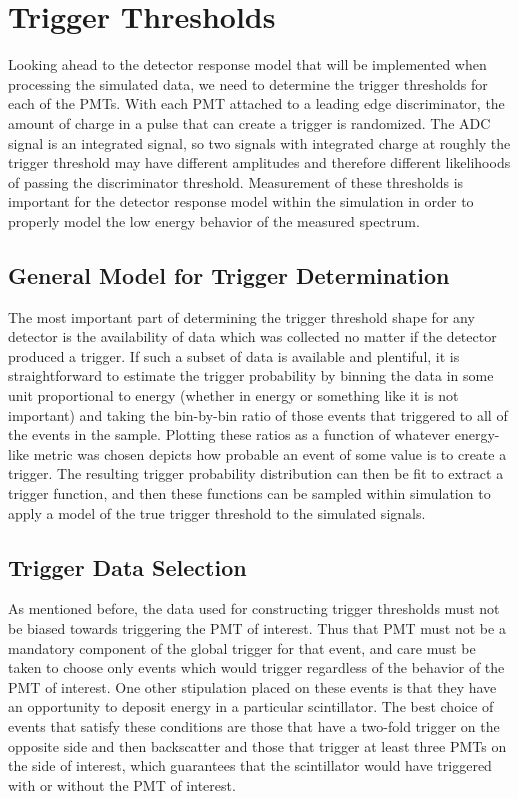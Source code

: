 \section{Trigger Thresholds} \label{sec:triggerThresh}

Looking ahead to the detector response model that will be implemented when processing
the simulated data, we need to determine the trigger thresholds for each of the
PMTs. With each PMT attached to a leading edge discriminator, the
amount of charge in a pulse that can create a trigger is randomized. The ADC signal
is an integrated signal, so two signals with integrated charge
at roughly the trigger threshold may have
different amplitudes and therefore different likelihoods of passing the discriminator threshold.
Measurement of these thresholds is important for the detector response model within the simulation
in order to properly model the low energy behavior of the measured spectrum.


\subsection{General Model for Trigger Determination} \label{ssec:genTrigModel}

The most important part of determining the trigger threshold shape for 
any detector is the availability of data which was collected no matter if 
the detector produced a trigger. If such a subset of 
data is available and plentiful, it is straightforward to estimate
the trigger probability by binning the data in some unit proportional to 
energy (whether in energy or something like it is not important) and taking 
the bin-by-bin ratio of those events that triggered to all of the events in the 
sample. Plotting these ratios as a function of whatever energy-like metric was chosen
depicts how probable an event of some value is to create a trigger. The resulting
trigger probability distribution can then be fit to extract a trigger function, and then
these functions can be sampled within simulation to apply a model of the
true trigger threshold to the simulated signals.


\subsection{Trigger Data Selection}
As mentioned before, the data used for constructing trigger thresholds must not be 
biased towards triggering the PMT of interest. Thus that PMT must not be a mandatory 
component of the global trigger for that event, and care must be taken to choose only 
events which would trigger regardless of the behavior of the PMT of interest. One
other stipulation placed on these events is that they have an opportunity to 
deposit energy in a particular scintillator. The best choice of events that 
satisfy these conditions are those that have a two-fold trigger on the opposite side 
and then backscatter and those that trigger at least three PMTs on the side of 
interest, which guarantees that the scintillator would have triggered with or without 
the PMT of interest.	

